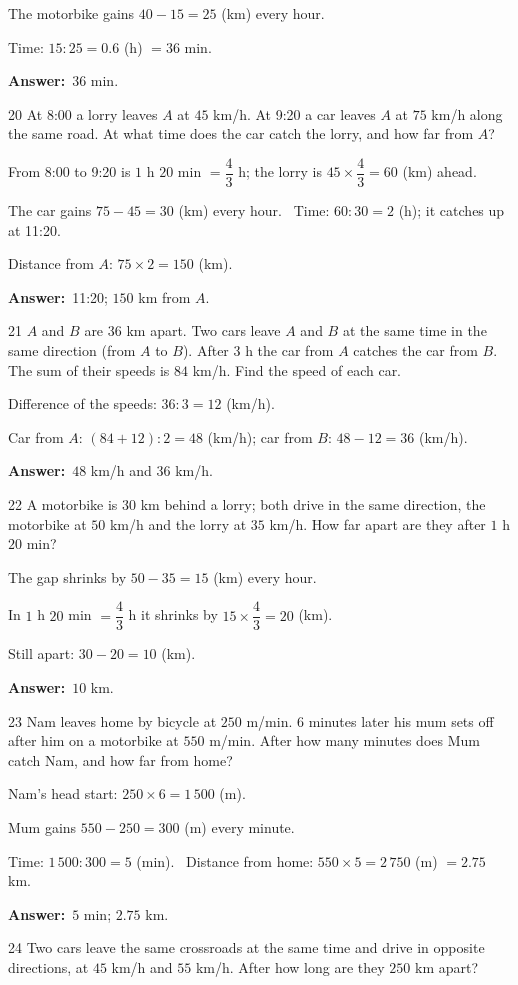 \documentclass[11pt]{article}
\newif\ifsol \solfalse
\providecommand{\AnsWord}{Đáp số}
\newcommand{\dapso}[1]{\par\textbf{\AnsWord:}\ #1}
\newcommand{\probsol}[1]{%
  \begin{lrbox}{\solmeasure}\begin{minipage}{\dimexpr\linewidth-24pt\relax}#1\end{minipage}\end{lrbox}%
  \ifsol
    \begin{solbox}#1\end{solbox}%
  \else
    \setlength{\solht}{\dimexpr\ht\solmeasure+\dp\solmeasure+0.85cm\relax}%
    \ifdim\solht<1.35cm\setlength{\solht}{1.35cm}\fi
    \begin{tcolorbox}[colback=white,colframe=Line,boxrule=0.8pt,arc=5pt,
      left=8pt,right=8pt,top=4pt,bottom=4pt,height=\solht]{\footnotesize\color{Slate}\itshape\WorkWord}\end{tcolorbox}%
  \fi}
\newcommand{\gap}{\vspace{0.3cm}}
\def\WorkWord{Your work:}
\def\AnsWord{Answer}
\begin{document}
\probsol{
The motorbike gains $40-15=25$ (km) every hour.\par Time: $15:25=0.6$ (h) $=36$ min.
\dapso{$36$ min.}}
\gap
\begin{probbox}{20}{\relax}
At 8:00 a lorry leaves $A$ at $45$ km/h. At 9:20 a car leaves $A$ at $75$ km/h along the same road. At what time does the car catch the lorry, and how far from $A$?
\end{probbox}
\probsol{
From 8:00 to 9:20 is $1$ h $20$ min $=\dfrac43$ h; the lorry is $45\times\dfrac43=60$ (km) ahead.\par
The car gains $75-45=30$ (km) every hour. \ Time: $60:30=2$ (h); it catches up at 11:20.\par
Distance from $A$: $75\times2=150$ (km).
\dapso{11:20; $150$ km from $A$.}}
\gap
\begin{probbox}{21}{\relax}
$A$ and $B$ are $36$ km apart. Two cars leave $A$ and $B$ at the same time in the same direction (from $A$ to $B$). After $3$ h the car from $A$ catches the car from $B$. The sum of their speeds is $84$ km/h. Find the speed of each car.
\end{probbox}
\probsol{
Difference of the speeds: $36:3=12$ (km/h).\par
Car from $A$: $(84+12):2=48$ (km/h); car from $B$: $48-12=36$ (km/h).
\dapso{$48$ km/h and $36$ km/h.}}
\gap
\begin{probbox}{22}{\relax}
A motorbike is $30$ km behind a lorry; both drive in the same direction, the motorbike at $50$ km/h and the lorry at $35$ km/h. How far apart are they after $1$ h $20$ min?
\end{probbox}
\probsol{
The gap shrinks by $50-35=15$ (km) every hour.\par In $1$ h $20$ min $=\dfrac43$ h it shrinks by $15\times\dfrac43=20$ (km).\par Still apart: $30-20=10$ (km).
\dapso{$10$ km.}}
\gap
\begin{probbox}{23}{\relax}
Nam leaves home by bicycle at $250$ m/min. $6$ minutes later his mum sets off after him on a motorbike at $550$ m/min. After how many minutes does Mum catch Nam, and how far from home?
\end{probbox}
\probsol{
Nam's head start: $250\times6=1\,500$ (m).\par Mum gains $550-250=300$ (m) every minute.\par
Time: $1\,500:300=5$ (min). \ Distance from home: $550\times5=2\,750$ (m) $=2.75$ km.
\dapso{$5$ min; $2.75$ km.}}
\gap
\begin{probbox}{24}{\relax}
Two cars leave the same crossroads at the same time and drive in opposite directions, at $45$ km/h and $55$ km/h. After how long are they $250$ km apart?
\end{probbox}
\end{document}
